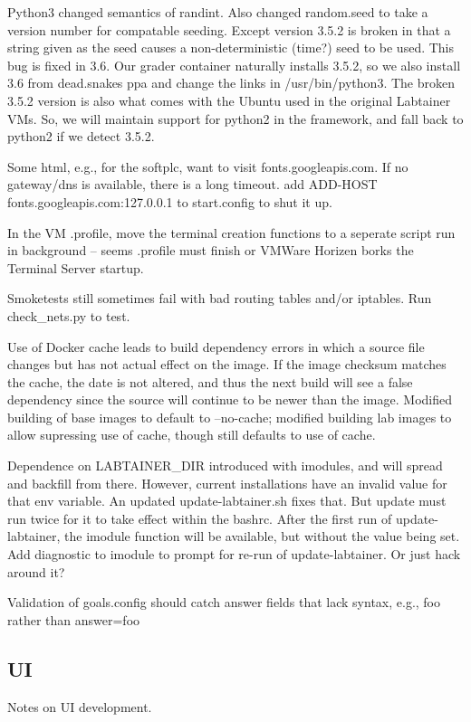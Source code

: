 \documentclass[12pt]{article}
\begin{document}
Python3 changed semantics of randint.  Also changed random.seed to take a version number for compatable seeding.
Except version 3.5.2 is broken in that a string given as the seed causes a non-deterministic (time?) seed to be used.
This bug is fixed in 3.6.  Our grader container naturally installs 3.5.2, so we also install 3.6 from dead.snakes ppa
and change the links in /usr/bin/python3. The broken 3.5.2 version is also what comes with the Ubuntu used in the original
Labtainer VMs.  So, we will maintain support for python2 in the framework, and fall back to python2 if we detect 3.5.2.

Some html, e.g., for the softplc, want to visit fonts.googleapis.com.  If no gateway/dns is available, there is a long timeout.
add         ADD-HOST fonts.googleapis.com:127.0.0.1 to start.config to shut it up.

In the VM .profile, move the terminal creation functions to a seperate script run in background -- seems .profile must finish or VMWare Horizen 
borks the Terminal Server startup.

Smoketests still sometimes fail with bad routing tables and/or iptables.  Run check\_nets.py to test.

Use of Docker cache leads to build dependency errors in which a source file changes but has not actual effect on the image.  If the image
checksum matches the cache, the date is not altered, and thus the next build will see a false dependency since the source will continue to
be newer than the image.  Modified building of base images to default to --no-cache; modified building lab images to allow supressing use of cache,
though still defaults to use of cache.

Dependence on LABTAINER\_DIR introduced with imodules, and will spread and backfill from there.  However, current installations have an invalid
value for that env variable.  An updated update-labtainer.sh fixes that.  But update must run twice for it to take effect within the bashrc.
After the first run of update-labtainer, the imodule function will be available, but without the value being set.  Add diagnostic to imodule to
prompt for re-run of update-labtainer.  Or just hack around it?

Validation of goals.config should catch answer fields that lack syntax, e.g., foo rather than answer=foo

\subsection {UI}
Notes on UI development.  
\end{document}

